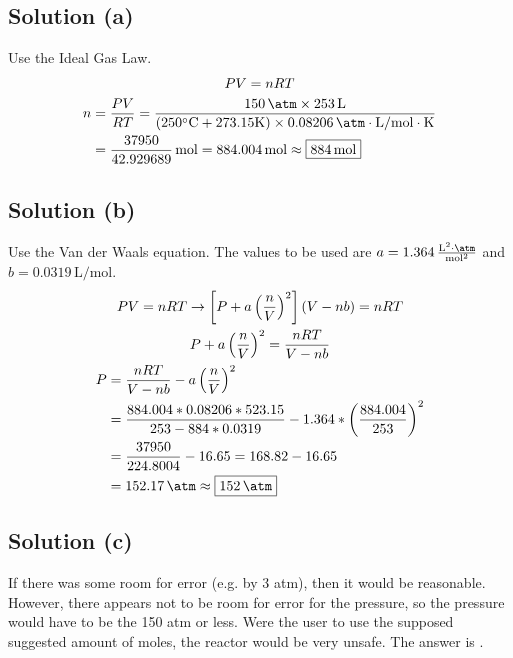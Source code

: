 \documentclass[10pt]{article}
\begin{document}
        \subsection{Solution (a)}
            Use the Ideal Gas Law. 
            \begin{gather}
                PV  =   nRT\\
                \begin{align}
                    n   &=  \frac{PV}{RT}
                        =   \frac{150\,\unit{\atm} \times 253\,\unit{\liter}}{(250\unit{\celsius} + 273.15\unit{\kelvin}) \times 0.08206\,\unit{\atm\cdot\liter/\mol\cdot\kelvin}}\\
                        &=  \frac{37950}{42.929689}\,\unit{\mole}
                        =   884.004\,\unit{\mole}
                        \approx \boxed{884\,\unit{\mole}}
                \end{align}
            \end{gather}

        \subsection{Solution (b)}
            Use the Van der Waals equation. 
            The values to be used are $a = 1.364\,\unit{\frac{L^2\cdot\atm}{\mole^2}}$ and $b = 0.0319\,\unit{\liter/\mole}$. 
            \begin{gather}
                PV  =   nRT \to 
                \left[ P + a \left( \frac{n}{V} \right)^2 \right]\left( V - nb \right) = nRT\\
                P + a \left( \frac{n}{V} \right)^2  =   \frac{nRT}{V - nb}\\
                \begin{align}
                    P   &=  \frac{nRT}{V - nb} - a \left( \frac{n}{V} \right)^2\\
                        &=  \frac{884.004 * 0.08206 * 523.15}{253 - 884 * 0.0319} - 1.364 * \left( \frac{884.004}{253} \right)^2\\
                        &=  \frac{37950}{224.8004} - 16.65
                        =   168.82 - 16.65\\
                        &=  152.17\,\unit{\atm}
                        \approx \boxed{152\,\unit{\atm}}
                \end{align}
            \end{gather}

        \subsection{Solution (c)}
            If there was some room for error (e.g. by 3 atm), then it would be reasonable. 
            However, there appears not to be room for error for the pressure, so the pressure would have to be the 150 atm or less.
            Were the user to use the supposed suggested amount of moles, the reactor would be very unsafe.
            The answer is . 
\end{document}

